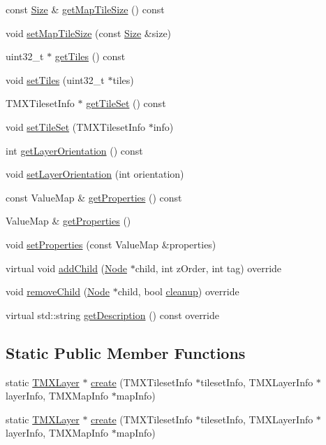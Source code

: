\begin{DoxyCompactItemize}
\item 
const \hyperlink{classSize}{Size} \& \hyperlink{classTMXLayer_acb38799b0ca66198f06c9b451b469118}{get\+Map\+Tile\+Size} () const
\item 
void \hyperlink{classTMXLayer_aefb7200c533405f89265e1c1cf1c7314}{set\+Map\+Tile\+Size} (const \hyperlink{classSize}{Size} \&size)
\item 
uint32\+\_\+t $\ast$ \hyperlink{classTMXLayer_a99a6fdaff73922809a3b2edbeb6d15e8}{get\+Tiles} () const
\item 
void \hyperlink{classTMXLayer_a5697a3402af12c2cd53ed67e344e5847}{set\+Tiles} (uint32\+\_\+t $\ast$tiles)
\item 
T\+M\+X\+Tileset\+Info $\ast$ \hyperlink{classTMXLayer_a2f1133ee7af2fa00682c68b5bca6541b}{get\+Tile\+Set} () const
\item 
void \hyperlink{classTMXLayer_a97b14b1c69b6bdc5e5fd2b6e99605263}{set\+Tile\+Set} (T\+M\+X\+Tileset\+Info $\ast$info)
\item 
int \hyperlink{classTMXLayer_af461c95bbedda35e396ae3c7cc3d38f7}{get\+Layer\+Orientation} () const
\item 
void \hyperlink{classTMXLayer_a0de2d7f74cf0563ab0c6f9f0de28c3aa}{set\+Layer\+Orientation} (int orientation)
\item 
const Value\+Map \& \hyperlink{classTMXLayer_aec0bca7dba4d5e454cf7b688388c2f5f}{get\+Properties} () const
\item 
Value\+Map \& \hyperlink{classTMXLayer_a48fdd277ced00a92a6d1ebd26a02fb11}{get\+Properties} ()
\item 
void \hyperlink{classTMXLayer_ac7368336ee0929ac575119db824a6362}{set\+Properties} (const Value\+Map \&properties)
\item 
virtual void \hyperlink{classTMXLayer_a6967088f51d0ad613c639b2592692116}{add\+Child} (\hyperlink{classNode}{Node} $\ast$child, int z\+Order, int tag) override
\item 
void \hyperlink{classTMXLayer_abaf25490e1f7807816c07167a8d4af46}{remove\+Child} (\hyperlink{classNode}{Node} $\ast$child, bool \hyperlink{classNode_aa2de84c6cdeec9cd647d236c30ee0567}{cleanup}) override
\item 
virtual std\+::string \hyperlink{classTMXLayer_a1238ed7681395864c66ebda4b90c5d3b}{get\+Description} () const override
\end{DoxyCompactItemize}
\subsection*{Static Public Member Functions}
\begin{DoxyCompactItemize}
\item 
static \hyperlink{classTMXLayer}{T\+M\+X\+Layer} $\ast$ \hyperlink{classTMXLayer_ab53489da78af9ae3523b17d807f23dbe}{create} (T\+M\+X\+Tileset\+Info $\ast$tileset\+Info, T\+M\+X\+Layer\+Info $\ast$layer\+Info, T\+M\+X\+Map\+Info $\ast$map\+Info)
\item 
static \hyperlink{classTMXLayer}{T\+M\+X\+Layer} $\ast$ \hyperlink{classTMXLayer_aae2efea498514da82da8cadedb8e6a60}{create} (T\+M\+X\+Tileset\+Info $\ast$tileset\+Info, T\+M\+X\+Layer\+Info $\ast$layer\+Info, T\+M\+X\+Map\+Info $\ast$map\+Info)
\end{DoxyCompactItemize}
